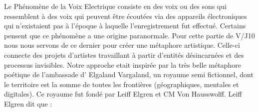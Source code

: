 {{Le Ph\'enom\`ene de la Voix Electrique consiste en des voix ou des sons
qui ressemblent \`a des voix qui peuvent \^etre \'ecout\'ees via des
appareils \'electroniques qui n'existaient pas \`a l'\'epoque \`a
laquelle l'enregistrement fut effectu\'e. Certains pensent que ce
ph\'enom\`ene a une origine paranormale. Pour cette partie de V/J10 nous nous servons de ce dernier pour
cr\'eer une m\'etaphore artistique. Celle-ci connecte des projets d'artistes
travaillant \`a partir d'entit\'es d\'esincarn\'ees et des processus
invisibles. Notre approche etait inspir\'ee par la tr\`es belle
m\'etaphore po\'etique de l'ambassade d' Elgaland Vargaland, un royaume
semi fictionnel, dont le territoire est la somme de toutes les
fronti\`eres (g\'eographiques, mentales et digitales). Ce royaume fut
fond\'e par Leiff Elgren et CM Von Hausswolff. Leiff Elgren dit que :

}

}
